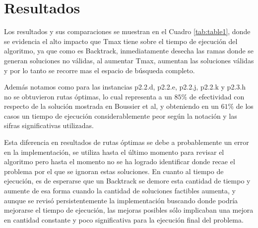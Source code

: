 \section{Resultados}\label{results}
Los resultados y sus comparaciones se muestran en el Cuadro \ref{tab:table1}, donde se evidencia el alto impacto que Tmax tiene sobre el tiempo de ejecuci\'on del algoritmo, ya que como es Backtrack, inmediatamente desecha las ramas donde se generan soluciones no v\'alidas, al aumentar Tmax, aumentan las soluciones v\'alidas y por lo tanto se recorre mas el espacio de b\'usqueda completo.

Adem\'as notamos como para las instancias p2.2.d, p2.2.e, p2.2.j, p2.2.k y p2.3.h no se obtuvieron rutas \'optimas, lo cual representa a un $85\%$ de efectividad con respecto de la soluci\'on mostrada en Boussier et al\cite{exactAlgorithm}, y obteniendo en un $61\%$ de los casos un tiempo de ejecuci\'on considerablemente peor seg\'un la notaci\'on y las sifras significativas utilizadas.

Esta diferencia en resultados de rutas \'optimas se debe a probablemente un error en la implementaci\'on, se utiliza hasta el \'ultimo momento para revisar el algoritmo pero hasta el momento no se ha logrado identificar donde recae el problema por el que se ignoran estas soluciones. En cuanto al tiempo de ejecuci\'on, es de esperarse que un Backtrack se demore esta cantidad de tiempo y aumente de esa forma cuando la cantidad de soluciones factibles aumenta, y aunque se revis\'o persistentemente la implementaci\'on buscando donde podr\'ia mejorarse el tiempo de ejecuci\'on, las mejoras posibles s\'olo implicaban una mejora en cantidad constante y poco significativa para la ejecuci\'on final del problema.


